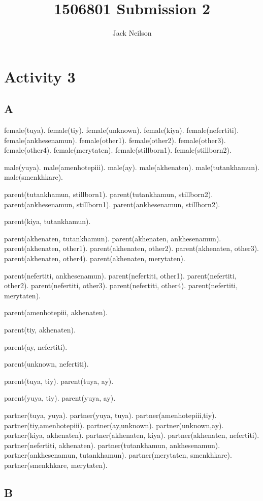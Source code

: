 \documentclass{article}
\begin{document}
\title{1506801 Submission 2}
\author{Jack Neilson}
\maketitle
\newpage
\section*{Activity 3}
\obeylines
\subsection*{A}

female(tuya).
female(tiy).
female(unknown).
female(kiya).
female(nefertiti).
female(ankhesenamun).
female(other1).
female(other2).
female(other3).
female(other4).
female(merytaten).
female(stillborn1).
female(stillborn2).

male(yuya).
male(amenhotepiii).
male(ay).
male(akhenaten).
male(tutankhamun).
male(smenkhkare).

parent(tutankhamun, stillborn1).
parent(tutankhamun, stillborn2).
parent(ankhesenamun, stillborn1).
parent(ankhesenamun, stillborn2).

parent(kiya, tutankhamun).

parent(akhenaten, tutankhamun).
parent(akhenaten, ankhesenamun).
parent(akhenaten, other1).
parent(akhenaten, other2).
parent(akhenaten, other3).
parent(akhenaten, other4).
parent(akhenaten, merytaten).

parent(nefertiti, ankhesenamun).
parent(nefertiti, other1).
parent(nefertiti, other2).
parent(nefertiti, other3).
parent(nefertiti, other4).
parent(nefertiti, merytaten).

parent(amenhotepiii, akhenaten).

parent(tiy, akhenaten).

parent(ay, nefertiti).

parent(unknown, nefertiti).

parent(tuya, tiy).
parent(tuya, ay).

parent(yuya, tiy).
parent(yuya, ay).


partner(tuya, yuya).
partner(yuya, tuya).
partner(amenhotepiii,tiy).
partner(tiy,amenhotepiii).
partner(ay,unknown).
partner(unknown,ay).
partner(kiya, akhenaten).
partner(akhenaten, kiya).
partner(akhenaten, nefertiti).
partner(nefertiti, akhenaten).
partner(tutankhamun, ankhesenamun).
partner(ankhesenamun, tutankhamun).
partner(merytaten, smenkhkare).
partner(smenkhkare, merytaten).

\subsection*{B}
\end{document}
